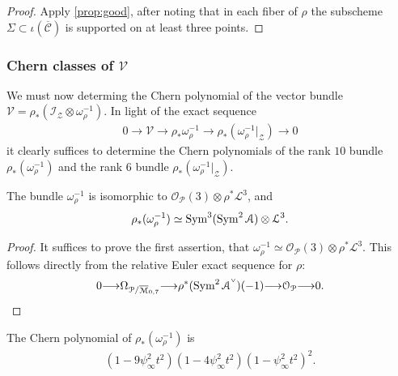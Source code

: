 \documentclass[12pt,reqno]{amsart}
\DeclareMathOperator{\M}{\mathcal{M}}
\renewcommand{\to}{{\longrightarrow}}
\numberwithin{equation}{section}
\renewcommand{\O}{\mathcal O}
\newcommand{\V}{\mathcal V}
\newcommand{\cP}{\mathcal P}
\newcommand{\smvee}{\raise0.5ex\hbox{$\scriptscriptstyle\vee$}}
\renewcommand {\o}[1]{\overline{#1}}
\begin{document}
\begin{proof}
  Apply \autoref{prop:good}, after noting that in
  each fiber of $\rho$ the subscheme
  $\Sigma \subset \iota(\o{\mathcal{C}})$ is supported on at least
  three points.
\end{proof}

\subsubsection{Chern classes of $\V$}
\label{sec:chern-classes-v2}

We must now determing the Chern polynomial of the vector bundle
$\V = \rho_{*}(\mathcal{I}_{\mathcal{Z}} \otimes
\omega_{\rho}^{-1})$. In light of the exact sequence
\begin{align}
  \label{eq:exact2}
  0 \to \V \to \rho_{*}\omega_{\rho}^{-1} \to \rho_{*}(\omega_{\rho}^{-1}|_{\mathcal{Z}}) \to 0
\end{align}
it clearly suffices to determine the Chern polynomials of the rank
$10$ bundle $\rho_{*}(\omega_{\rho}^{-1})$ and the rank $6$ bundle
$\rho_{*}(\omega_{\rho}^{-1}|_{\mathcal{Z}})$.

\begin{lemma}
  \label{lemma:rank10}
  The bundle $\omega_{\rho}^{-1}$ is isomorphic to
  $\O_{\mathcal{P}}(3) \otimes \rho^{*}\mathcal{L}^{3}$, and
  \begin{align}
    \label{eq:rnk10}
    \rho_{*}(\omega_{\rho}^{-1}) \simeq \operatorname{Sym}^{3}(\operatorname{Sym}^{2} \mathcal{A})\otimes \mathcal{L}^{3}.
  \end{align}
\end{lemma}

\begin{proof}
  It suffices to prove the first assertion, that
  $\omega_{\rho}^{-1} \simeq \O_{\mathcal{P}}(3) \otimes
  \rho^{*}\mathcal{L}^{3}$.  This follows directly from the relative
  Euler exact sequence for $\rho$:
  \begin{align}
    \label{eq:eulerexact}
    0 \to \Omega_{\mathcal{P}/\o{\M}_{0,7}} \to \rho^{*}(\Sym^{2}\mathcal{A}^{\smvee})(-1) \to \O_{\cP} \to 0.
  \end{align}
\end{proof}

\begin{corollary}
  \label{cor:chern10} The Chern polynomial of
  $\rho_{*}(\omega_{\rho}^{-1})$ is
  \begin{align}
    \label{eq:chern10}
    (1-9\psi_{\infty}^{2}t^{2})(1-4\psi_{\infty}^{2}t^{2})(1-\psi_{\infty}^{2}t^{2})^{2}.
  \end{align}
\end{corollary}
\end{document}

